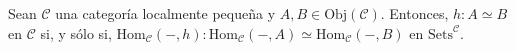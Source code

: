 \documentclass[tesis]{subfiles}
\begin{document}
%
%
%

\begin{Prop}\label{Mendoza_CT-Ejer.8}
    
    Sean $\mathscr{C}$ una categoría localmente pequeña y $A,B\in\text{Obj}(\mathscr{C})$. Entonces, $h:A\simeq B$ en $\mathscr{C}$ si, y sólo si, $\text{Hom}_\mathscr{C}(-,h):\text{Hom}_\mathscr{C}(-,A)\simeq \text{Hom}_\mathscr{C}(-,B)$ en $\text{Sets}^\mathscr{C}$.
\end{Prop}
\end{document}
